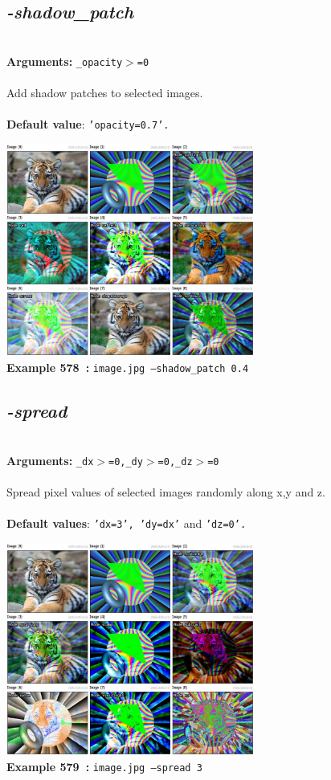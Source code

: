 \documentclass[a4paper,11pt,twoside]{book}
\begin{document}
\subsection{\emph{-shadow\_patch} }\vspace*{-0.5em}
~\\\textbf{Arguments: } 
{\small \texttt{\_opacity$>$=0}}\\~\\
Add shadow patches to selected images.
~\\~\\\textbf{Default value}: {\small \texttt{'opacity=0.7'.}}
\begin{center}\includegraphics[keepaspectratio=true,height=7cm,width=\textwidth]{img/gmic_def578.jpg}\\
{\footnotesize \textbf{Example 578~:} \texttt{image.jpg --shadow\_patch 0.4}}
\end{center}

\subsection{\emph{-spread} }\vspace*{-0.5em}
~\\\textbf{Arguments: } 
{\small \texttt{\_dx$>$=0,\_dy$>$=0,\_dz$>$=0}}\\~\\
Spread pixel values of selected images randomly along x,y and z.
~\\~\\\textbf{Default values}: {\small \texttt{'dx=3', 'dy=dx'} and \texttt{'dz=0'.}}
\begin{center}\includegraphics[keepaspectratio=true,height=7cm,width=\textwidth]{img/gmic_def579.jpg}\\
{\footnotesize \textbf{Example 579~:} \texttt{image.jpg --spread 3}}
\end{center}
\end{document}
